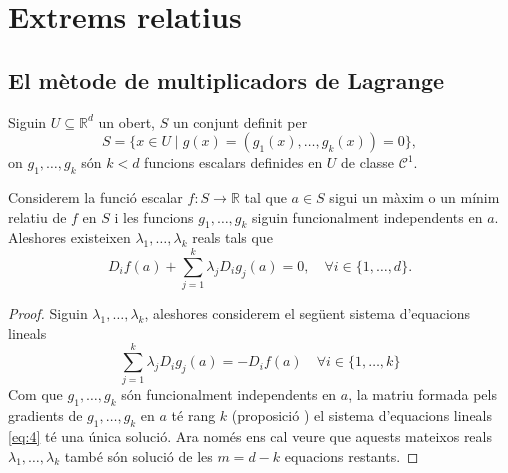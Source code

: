 \documentclass[../Apunts.tex]{subfiles}
\begin{document}
	\section{Extrems relatius}
	\subsection{El mètode de multiplicadors de Lagrange} %
	\begin{theorem}
		\label{thm:Multiplicadors de Lagrange}
		Siguin \(U\subseteq\mathbb{R}^{d}\) un obert, \(S\) un conjunt definit per
		\[S=\{x\in U\mid g(x)=(g_{1}(x),\dots,g_{k}(x))=0\},\]
		on \(g_{1},\dots,g_{k}\) són \(k<d\) funcions escalars definides en \(U\) de classe \(\mathcal{C}^{1}\).
		
		Considerem la funció escalar \(f\colon S\to\mathbb{R}\) tal que \(a\in S\) sigui un màxim o un mínim relatiu de \(f\) en \(S\) i les funcions \(g_{1},\dots,g_{k}\) siguin funcionalment independents en \(a\). Aleshores existeixen \(\lambda_{1},\dots,\lambda_{k}\) reals tals que
		\[D_{i}f(a)+\sum_{j=1}^{k}\lambda_{j}D_{i}g_{j}(a)=0,\quad\forall i\in\{1,\dots,d\}.\]
		\begin{proof}
			Siguin \(\lambda_{1},\dots,\lambda_{k}\), aleshores considerem el següent sistema d'equacions lineals
			\begin{equation}\label{eq:4}
			\sum_{j=1}^{k}\lambda_{j}D_{i}g_{j}(a)=-D_{i}f(a)\quad\forall i\in\{1,\dots,k\}
			\end{equation}
			Com que \(g_{1},\dots,g_{k}\) són funcionalment independents en \(a\), la matriu formada pels gradients de \(g_{1},\dots,g_{k}\) en \(a\) té rang \(k\) (proposició ) el sistema d'equacions lineals \eqref{eq:4} té una única solució. Ara només ens cal veure que aquests mateixos reals \(\lambda_{1},\dots,\lambda_{k}\) també són solució de les \(m=d-k\) equacions restants.
			

\end{proof}
\end{theorem}
\end{document}
